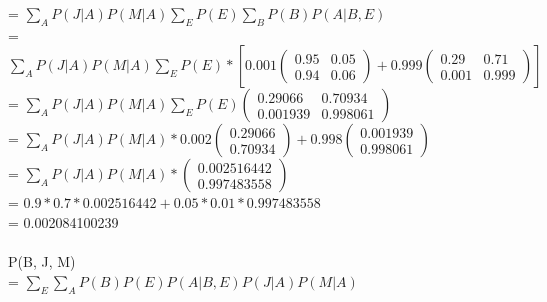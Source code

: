 \documentclass{article}
\begin{document}
\indent 
= $\sum_{A}P(J \vert A)P(M \vert A)\sum_{E}P(E)\sum_{B}P(B)P(A \vert B, E)$ \\

\indent 
= $\sum_{A}P(J \vert A)P(M \vert A)\sum_{E}P(E) * [0.001 
    \left(\begin{array}{cc} 
        0.95 & 0.05 \\ 
        0.94 & 0.06 
        \end{array}\right)
+ 0.999
    \left(\begin{array}{cc} 
        0.29 & 0.71 \\ 
        0.001 & 0.999 
        \end{array}\right)]$ \\ 

\indent 
= $\sum_{A}P(J \vert A)P(M \vert A)\sum_{E}P(E) 
    \left(\begin{array}{cc} 
        0.29066 & 0.70934 \\ 
        0.001939 & 0.998061 
        \end{array}\right)$ \\ 

\indent 
= $\sum_{A}P(J \vert A)P(M \vert A)* 0.002 
    \left(\begin{array}{c} 
        0.29066 \\ 
        0.70934
        \end{array}\right) + 0.998 
    \left(\begin{array}{c} 
        0.001939 \\ 
        0.998061 
        \end{array}\right)$ \\ 

\indent 
= $\sum_{A}P(J \vert A)P(M \vert A) * 
    \left(\begin{array}{c} 
        0.002516442 \\ 
        0.997483558 
        \end{array}\right)$ \\ 

\indent 
= $0.9 * 0.7 * 0.002516442 + 0.05 * 0.01 * 0.997483558$ \\

\indent 
= 0.002084100239 \\
\\

\noindent
P(B, J, M) \\ 

\indent 
= $\sum_{E}\sum_{A}P(B)P(E)P(A \vert B, E)P(J \vert A)P(M \vert A)$ \\ 
\end{document}
